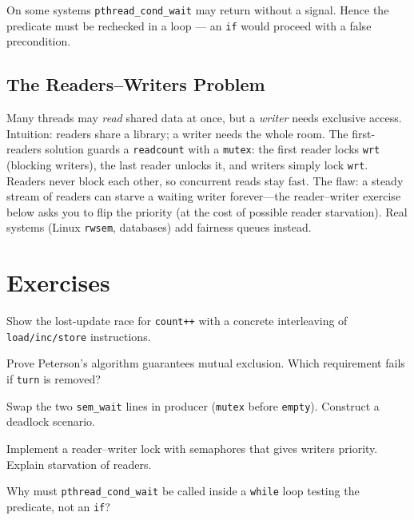\begin{remark}
On some systems \texttt{pthread\_cond\_wait} may return without a signal.
Hence the predicate must be rechecked in a loop --- an \texttt{if} would
proceed with a false precondition.
\end{remark}

\subsection{The Readers--Writers Problem}
\label{sec:readers-writers}

Many threads may \emph{read} shared data at once, but a \emph{writer} needs exclusive access. Intuition: readers share a library; a writer needs the whole room. The first-readers solution guards a \texttt{readcount} with a \texttt{mutex}: the first reader locks \texttt{wrt} (blocking writers), the last reader unlocks it, and writers simply lock \texttt{wrt}. Readers never block each other, so concurrent reads stay fast. The flaw: a steady stream of readers can starve a waiting writer forever---the reader--writer exercise below asks you to flip the priority (at the cost of possible reader starvation). Real systems (Linux \texttt{rwsem}, databases) add fairness queues instead.

\section{Exercises}
\label{sec:ch04-ex}
\begin{exercise}
Show the lost-update race for \texttt{count++} with a concrete interleaving
of \texttt{load/inc/store} instructions.
\end{exercise}
\begin{exercise}
Prove Peterson's algorithm guarantees mutual exclusion. Which requirement fails
if \texttt{turn} is removed?
\end{exercise}
\begin{exercise}
Swap the two \texttt{sem\_wait} lines in producer (\texttt{mutex} before
\texttt{empty}). Construct a deadlock scenario.
\end{exercise}
\begin{exercise}
Implement a reader--writer lock with semaphores that gives writers priority.
Explain starvation of readers.
\end{exercise}
\begin{exercise}
Why must \texttt{pthread\_cond\_wait} be called inside a \texttt{while} loop
testing the predicate, not an \texttt{if}?
\end{exercise}
